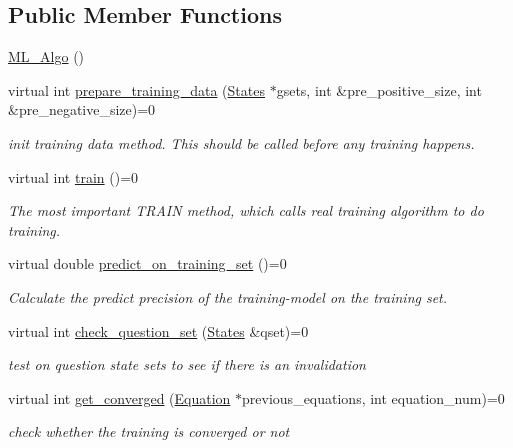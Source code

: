 \subsection*{Public Member Functions}
\begin{DoxyCompactItemize}
\item 
\hyperlink{classML__Algo_a7b8c13ce9739e50cc6f6d097469f0326}{M\+L\+\_\+\+Algo} ()
\item 
virtual int \hyperlink{classML__Algo_ab98458d234bdf97c2ed678030d90c513}{prepare\+\_\+training\+\_\+data} (\hyperlink{classStates}{States} $\ast$gsets, int \&pre\+\_\+positive\+\_\+size, int \&pre\+\_\+negative\+\_\+size)=0
\begin{DoxyCompactList}\small\item\em init training data method. This should be called before any training happens. \end{DoxyCompactList}\item 
virtual int \hyperlink{classML__Algo_a0a5d241191d4249c60a40d966fb19aee}{train} ()=0
\begin{DoxyCompactList}\small\item\em The most important T\+R\+A\+IN method, which calls real training algorithm to do training. \end{DoxyCompactList}\item 
virtual double \hyperlink{classML__Algo_a39dd640e7c910becf611b9265843ac77}{predict\+\_\+on\+\_\+training\+\_\+set} ()=0
\begin{DoxyCompactList}\small\item\em Calculate the predict precision of the training-\/model on the training set. \end{DoxyCompactList}\item 
virtual int \hyperlink{classML__Algo_a4d757e7fb178ce41ec713bcd84807d33}{check\+\_\+question\+\_\+set} (\hyperlink{classStates}{States} \&qset)=0
\begin{DoxyCompactList}\small\item\em test on question state sets to see if there is an invalidation \end{DoxyCompactList}\item 
virtual int \hyperlink{classML__Algo_a3d2c7bfa53c13005dfde112c9e473c5e}{get\+\_\+converged} (\hyperlink{classEquation}{Equation} $\ast$previous\+\_\+equations, int equation\+\_\+num)=0
\begin{DoxyCompactList}\small\item\em check whether the training is converged or not \end{DoxyCompactList}\item 

\end{DoxyCompactItemize}
